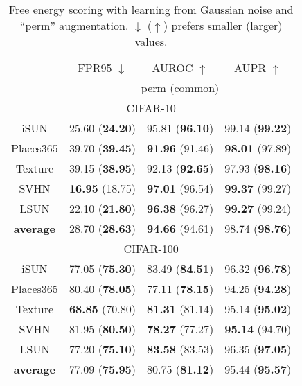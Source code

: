 \documentclass{article}
\begin{document}
\begin{table}[t]
\parbox{.47\linewidth}{
\centering
\caption{{Free energy scoring with learning from Gaussian noise and ``perm'' augmentation. $\downarrow$ ($\uparrow$) prefers smaller (larger) values.}} \label{tab: eneregy perm}
\vspace{5pt}
\scriptsize
{
\begin{tabular}{c|ccc}
\toprule[1.5pt]
                   & FPR95 $\downarrow$     & AUROC $\uparrow$       & AUPR $\uparrow$      \\
                   \cline{2-4} 
\multirow{-2}{*}{} & \multicolumn{3}{c}{perm (common)} \\
\midrule[0.6pt]
\multicolumn{4}{c}{\cellcolor{greyL}CIFAR-10} \\
\midrule[0.6pt]
iSUN               & 25.60 (\textbf{24.20}) & 95.81 (\textbf{96.10}) & 99.14 (\textbf{99.22}) \\ 
Places$365$        & 39.70 (\textbf{39.45}) & \textbf{91.96} (91.46) & \textbf{98.01} (97.89) \\
Texture            & 39.15 (\textbf{38.95}) & 92.13 (\textbf{92.65}) & 97.93 (\textbf{98.16}) \\
SVHN               & \textbf{16.95} (18.75) & \textbf{97.01} (96.54) & \textbf{99.37} (99.27) \\
LSUN               & 22.10 (\textbf{21.80}) & \textbf{96.38} (96.27) & \textbf{99.27} (99.24) \\
\midrule
\textbf{average}   & 28.70 (\textbf{28.63}) & \textbf{94.66} (94.61) & {98.74} (\textbf{98.76}) \\ \midrule[1pt]
\multicolumn{4}{c}{\cellcolor{greyL}CIFAR-100} \\
\midrule[1pt]
iSUN               & 77.05 (\textbf{75.30}) & 83.49 (\textbf{84.51}) & 96.32 (\textbf{96.78}) \\ 
Places$365$        & 80.40 (\textbf{78.05}) & 77.11 (\textbf{78.15}) & 94.25 (\textbf{94.28}) \\
Texture            & \textbf{68.85} (70.80) & \textbf{81.31} (81.14) & 95.14 (\textbf{95.02}) \\
SVHN               & 81.95 (\textbf{80.50}) & \textbf{78.27} (77.27) & \textbf{95.14} (94.70) \\
LSUN               & 77.20 (\textbf{75.10}) & \textbf{83.58} (83.53) & 96.35 (\textbf{97.05}) \\
\midrule
\textbf{average}   & 77.09 (\textbf{75.95}) & 80.75 (\textbf{81.12}) & 95.44 (\textbf{95.57}) \\ \bottomrule[1.5pt]      

\end{tabular}}}
\end{table}
\end{document}

